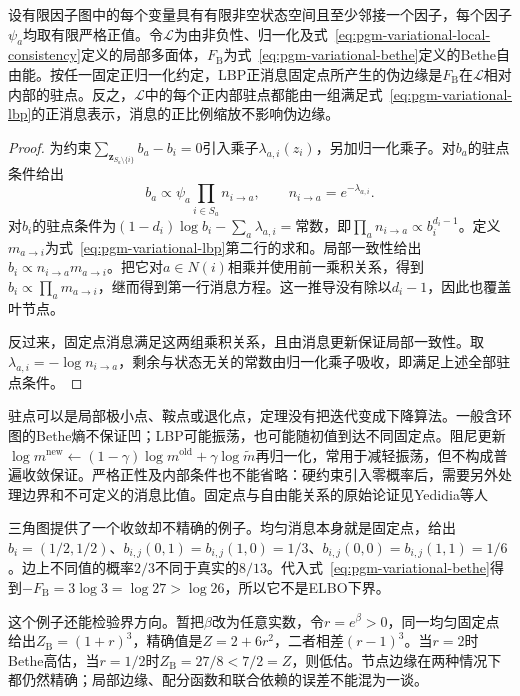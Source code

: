 \begin{theorem}[正消息固定点与Bethe驻点]
  \label{thm:pgm-variational-bp-stationary}
  设有限因子图中的每个变量具有有限非空状态空间且至少邻接一个因子，每个因子$\psi_a$均取有限严格正值。令$\mathcal L$为由非负性、归一化及式~\eqref{eq:pgm-variational-local-consistency}定义的局部多面体，$F_{\mathrm B}$为式~\eqref{eq:pgm-variational-bethe}定义的Bethe自由能。按任一固定正归一化约定，LBP正消息固定点所产生的伪边缘是$F_{\mathrm B}$在$\mathcal L$相对内部的驻点。反之，$\mathcal L$中的每个正内部驻点都能由一组满足式~\eqref{eq:pgm-variational-lbp}的正消息表示，消息的正比例缩放不影响伪边缘。
\end{theorem}
\begin{proof}
  为约束$\sum_{\bm z_{S_a\setminus\{i\}}}b_a-b_i=0$引入乘子$\lambda_{a,i}(z_i)$，另加归一化乘子。对$b_a$的驻点条件给出
  \[
    b_a\propto\psi_a\prod_{i\in S_a}n_{i\to a},
    \qquad n_{i\to a}=e^{-\lambda_{a,i}}.
  \]
  对$b_i$的驻点条件为$(1-d_i)\log b_i-\sum_a\lambda_{a,i}=\text{常数}$，即$\prod_a n_{i\to a}\propto b_i^{d_i-1}$。定义$m_{a\to i}$为式~\eqref{eq:pgm-variational-lbp}第二行的求和。局部一致性给出$b_i\propto n_{i\to a}m_{a\to i}$。把它对$a\in N(i)$相乘并使用前一乘积关系，得到$b_i\propto\prod_a m_{a\to i}$，继而得到第一行消息方程。这一推导没有除以$d_i-1$，因此也覆盖叶节点。

  反过来，固定点消息满足这两组乘积关系，且由消息更新保证局部一致性。取$\lambda_{a,i}=-\log n_{i\to a}$，剩余与状态无关的常数由归一化乘子吸收，即满足上述全部驻点条件。
\end{proof}

驻点可以是局部极小点、鞍点或退化点，定理没有把迭代变成下降算法。一般含环图的Bethe熵不保证凹；LBP可能振荡，也可能随初值到达不同固定点。阻尼更新$\log m^{\mathrm{new}}\leftarrow(1-\gamma)\log m^{\mathrm{old}}+\gamma\log\widetilde m$再归一化，常用于减轻振荡，但不构成普遍收敛保证。严格正性及内部条件也不能省略：硬约束引入零概率后，需要另外处理边界和不可定义的消息比值。固定点与自由能关系的原始论证见Yedidia等人

三角图提供了一个收敛却不精确的例子。均匀消息本身就是固定点，给出$b_i=(1/2,1/2)$、$b_{i,j}(0,1)=b_{i,j}(1,0)=1/3$、$b_{i,j}(0,0)=b_{i,j}(1,1)=1/6$。边上不同值的概率$2/3$不同于真实的$8/13$。代入式~\eqref{eq:pgm-variational-bethe}得到$-F_{\mathrm B}=3\log3=\log27>\log26$，所以它不是ELBO下界。

这个例子还能检验界方向。暂把$\beta$改为任意实数，令$r=e^\beta>0$，同一均匀固定点给出$Z_{\mathrm B}=(1+r)^3$，精确值是$Z=2+6r^2$，二者相差$(r-1)^3$。当$r=2$时Bethe高估，当$r=1/2$时$Z_{\mathrm B}=27/8<7/2=Z$，则低估。节点边缘在两种情况下都仍然精确；局部边缘、配分函数和联合依赖的误差不能混为一谈。

